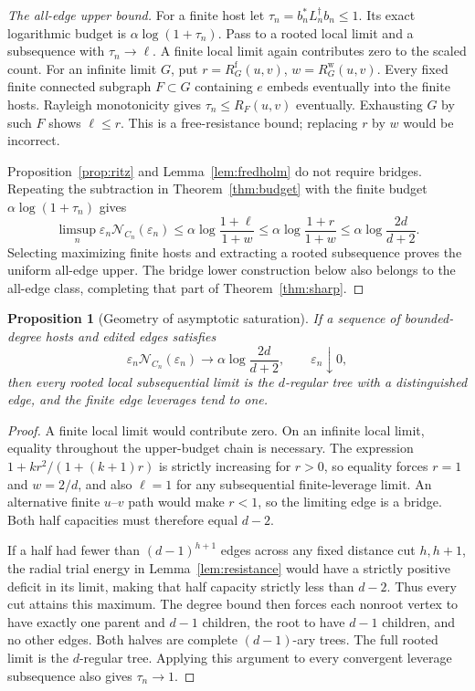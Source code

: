 \documentclass[11pt]{article}
\newtheorem{proposition}[theorem]{Proposition}
\newcommand{\N}{\mathcal N}
\begin{document}
\begin{proof}[The all-edge upper bound]
For a finite host let $\tau_n=b_n^*L_n^\dagger b_n\le1$. Its exact
logarithmic budget is $\alpha\log(1+\tau_n)$. Pass to a rooted local
limit and a subsequence with $\tau_n\to\ell$. A finite local limit
again contributes zero to the scaled count. For an infinite limit $G$,
put $r=R_G^{\mathrm f}(u,v)$, $w=R_G^{\mathrm w}(u,v)$.
Every fixed finite connected subgraph $F\subset G$ containing $e$
embeds eventually into the finite hosts. Rayleigh monotonicity gives
$\tau_n\le R_F(u,v)$ eventually. Exhausting $G$ by such $F$ shows
$\ell\le r$. This is a free-resistance bound; replacing $r$ by $w$
would be incorrect.

Proposition~\ref{prop:ritz} and Lemma~\ref{lem:fredholm} do not require
bridges. Repeating the subtraction in Theorem~\ref{thm:budget} with the
finite budget $\alpha\log(1+\tau_n)$ gives
\[
 \limsup_n\varepsilon_n\N_{C_n}(\varepsilon_n)
 \le\alpha\log\frac{1+\ell}{1+w}
 \le\alpha\log\frac{1+r}{1+w}
 \le\alpha\log\frac{2d}{d+2}.
\]
Selecting maximizing finite hosts and extracting a rooted subsequence
proves the uniform all-edge upper. The bridge lower construction below
also belongs to the all-edge class, completing that part of
Theorem~\ref{thm:sharp}.
\end{proof}

\begin{proposition}[Geometry of asymptotic saturation]\label{prop:rigidity}
If a sequence of bounded-degree hosts and edited edges satisfies
\[
 \varepsilon_n\N_{C_n}(\varepsilon_n)
       \longrightarrow\alpha\log\frac{2d}{d+2},\qquad
                         \varepsilon_n\downarrow0,
\]
then every rooted local subsequential limit is the $d$-regular tree
with a distinguished edge, and the finite edge leverages tend to one.
\end{proposition}
\begin{proof}
A finite local limit would contribute zero. On an infinite local
limit, equality throughout the upper-budget chain is necessary.
The expression $1+kr^2/(1+(k+1)r)$ is strictly increasing for $r>0$,
so equality forces $r=1$ and $w=2/d$, and also $\ell=1$ for any
subsequential finite-leverage limit. An alternative finite $u$--$v$
path would make $r<1$, so the limiting edge is a bridge.
Both half capacities must therefore equal $d-2$.

If a half had fewer than $(d-1)^{h+1}$ edges across any fixed distance
cut $h,h+1$, the radial trial energy in Lemma~\ref{lem:resistance}
would have a strictly positive deficit in its limit, making that half
capacity strictly less than $d-2$. Thus every cut attains this maximum.
The degree bound then forces each nonroot vertex to have exactly one
parent and $d-1$ children, the root to have $d-1$ children, and no
other edges. Both halves are complete $(d-1)$-ary trees. The full
rooted limit is the $d$-regular tree. Applying this argument to every
convergent leverage subsequence also gives $\tau_n\to1$.
\end{proof}
\end{document}
